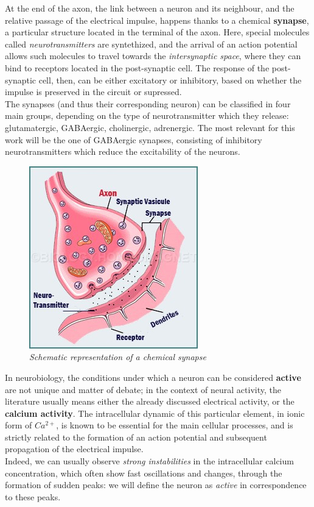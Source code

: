 \documentclass[a4paper]{article}
\begin{document}
At the end of the axon, the link between a neuron and its neighbour, and the relative passage of the electrical impulse, happens thanks to a chemical \textbf{synapse}, a particular structure located in the terminal of the axon. Here, special molecules called \textit{neurotransmitters} are syntethized, and the arrival of an action potential allows such molecules to travel towards the \textit{intersynaptic space}, where they can bind to receptors located in the post-synaptic cell. The response of the post-synaptic cell, then, can be either excitatory or inhibitory, based on whether the impulse is preserved in the circuit or supressed.\\
The synapses (and thus their corresponding neuron) can be classified in four main groups, depending on the type of neurotransmitter which they release:  glutamatergic, GABAergic, cholinergic,  adrenergic. The most relevant for this work will be the one of GABAergic synapses, consisting of inhibitory neurotransmitters which reduce the excitability of the neurons.
\begin{figure}[H]
	\begin{center}
		\includegraphics[scale=1.6]{synapse.jpg} 
	\end{center} 
	\caption{\textit{Schematic representation of a chemical synapse}}
	
\end{figure}



In neurobiology, the conditions under which a neuron can be considered \textbf{active} are not unique and matter of debate; in the context of neural activity, the literature usually means either the already discussed electrical activity, or the \textbf{calcium activity}. The intracellular dynamic of this particular element, in ionic form of $Ca^{2+}$, is known to be essential for the main cellular processes, and is strictly related to the formation of an action potential and subsequent propagation of the electrical impulse.\\
 Indeed, we can usually observe  \textit{strong instabilities} in the intracellular calcium concentration, which often show fast oscillations and changes, through the formation of sudden peaks: we will define the neuron as \textit{active} in correspondence to these peaks.
\end{document}
